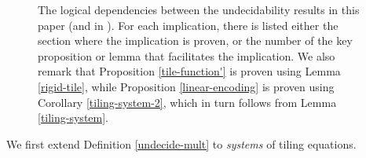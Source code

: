 \documentclass[reqno,a4paper,12pt]{amsart}
\numberwithin{equation}{section}
\numberwithin{figure}{section}
\theoremstyle{plain}
\theoremstyle{definition}
\begin{document}
\begin{figure}
    \centering
    \caption{The logical dependencies between the undecidability results in this paper (and in \cite{Ber}).  For each implication, there is listed either the section where the implication is proven, or the number of the key proposition or lemma that facilitates the implication. We also remark that Proposition \ref{tile-function'} is proven using Lemma \ref{rigid-tile}, while Proposition \ref{linear-encoding} is proven using Corollary \ref{tiling-system-2}, which in turn follows from Lemma \ref{tiling-system}.}
    \label{fig:logic}
\end{figure}

We first extend Definition \ref{undecide-mult} to \emph{systems} of tiling equations.
\end{document}

